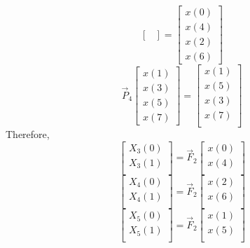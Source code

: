 \documentclass[journal,12pt,twocolumn]{IEEEtran}
\renewcommand\thesection{\arabic{section}}
\begin{document}
\begin{enumerate}[label=\thesection.\arabic*]
\begin{equation}
\begin{bmatrix}
\end{bmatrix}
= 
\begin{bmatrix}
x(0) \\ 
x(4) \\ 
x(2) \\
x(6)
\end{bmatrix}
\end{equation}
\begin{equation}
\vec{P}_{4}
\begin{bmatrix}
x(1) \\ 
x(3) \\ 
x(5) \\
x(7)
\end{bmatrix}
= 
\begin{bmatrix}
x(1) \\ 
x(5) \\ 
x(3) \\ 
x(7) \\
\end{bmatrix}
\end{equation}
Therefore,
\begin{equation}
\begin{bmatrix}
X_{3}(0) \\ 
X_{3}(1)\\ 
\end{bmatrix}
= \vec{F}_{2}
\begin{bmatrix}
x(0) \\ 
x(4) \\ 
\end{bmatrix}
\end{equation}
\begin{equation}
\begin{bmatrix}
X_{4}(0) \\ 
X_{4}(1)\\ 
\end{bmatrix}
= \vec{F}_{2}
\begin{bmatrix}
x(2) \\ 
x(6) \\ 
\end{bmatrix}
\end{equation}
\begin{equation}
\begin{bmatrix}
X_{5}(0) \\ 
X_{5}(1)\\ 
\end{bmatrix}
= \vec{F}_{2}
\begin{bmatrix}
x(1) \\ 
x(5) \\ 

\end{bmatrix}
\end{equation}
\end{enumerate}
\end{document}
